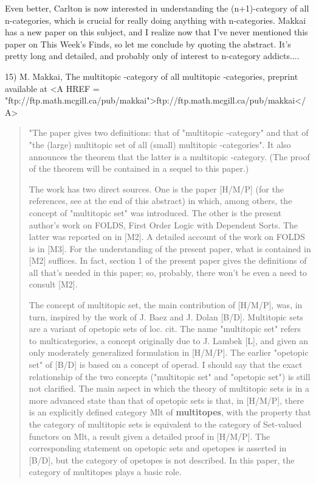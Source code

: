 Even better, Carlton is now interested in understanding the (n+1)-category 
of all n-categories, which is crucial for really doing anything with 
n-categories.  Makkai has a new paper on this subject, and I realize now 
that I've never mentioned this paper on This Week's Finds, so let me 
conclude by quoting the abstract.  It's pretty long and detailed, and
probably only of interest to n-category addicts....

15) M. Makkai, The multitopic \omega -category of all multitopic 
\omega -categories, preprint available at <A HREF = "ftp://ftp.math.mcgill.ca/pub/makkai">ftp://ftp.math.mcgill.ca/pub/makkai</A>

\begin{quote}
"The paper gives two definitions: that of "multitopic \omega -category" and
that of "the (large) multitopic set of all (small) multitopic
\omega -categories". It also announces the theorem that the latter is a
multitopic \omega -category. (The proof of the theorem will be contained in
a sequel to this paper.)

The work has two direct sources. One is the paper [H/M/P] (for the
references, see at the end of this abstract) in which, among others, the
concept of "multitopic set" was introduced. The other is the present
author's work on FOLDS, First Order Logic with Dependent Sorts. The
latter was reported on in [M2]. A detailed account of the work on FOLDS is
in [M3]. For the understanding of the present paper, what is contained in
[M2] suffices. In fact, section 1 of the present paper gives the
definitions of all that's needed in this paper; so, probably, there won't
be even a need to consult [M2]. 

The concept of multitopic set, the main contribution of [H/M/P], was, in
turn, inspired by the work of J. Baez and J. Dolan [B/D]. Multitopic sets
are a variant of opetopic sets of loc. cit. The name "multitopic set"
refers to multicategories, a concept originally due to J. Lambek [L], and
given an only moderately generalized formulation in [H/M/P]. The earlier
"opetopic set" of [B/D] is based on a concept of operad. I should say that
the exact relationship of the two concepts ("multitopic set" and "opetopic
set") is still not clarified. The main aspect in which the theory of
multitopic sets is in a more advanced state than that of opetopic sets is
that, in [H/M/P], there is an explicitly defined category Mlt of
\textbf{multitopes}, with the property that the category of multitopic sets is
equivalent to the category of Set-valued functors on Mlt, a result given a
detailed proof in [H/M/P]. The corresponding statement on opetopic sets
and opetopes is asserted in [B/D], but the category of opetopes is not
described. In this paper, the category of multitopes plays a basic role.


\end{quote}
